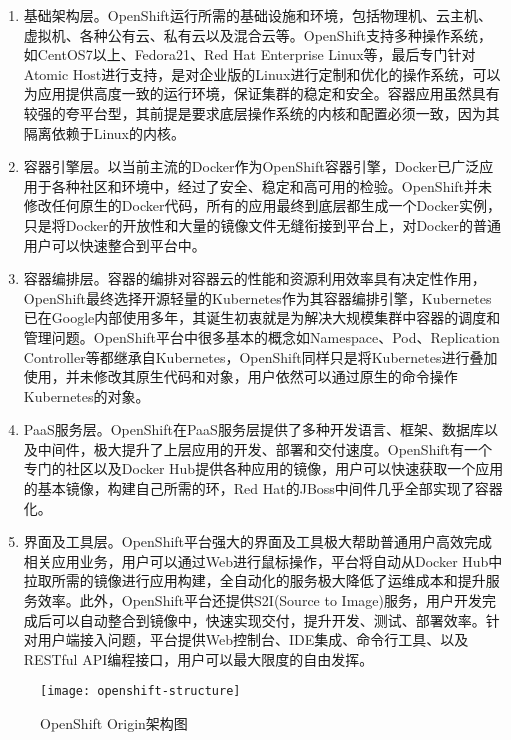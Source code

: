 \begin{enumerate}[1.]
	\item 基础架构层。OpenShift运行所需的基础设施和环境，包括物理机、云主机、虚拟机、各种公有云、私有云以及混合云等。OpenShift支持多种操作系统，如CentOS7以上、Fedora21、Red Hat Enterprise Linux等，最后专门针对Atomic Host进行支持，是对企业版的Linux进行定制和优化的操作系统，可以为应用提供高度一致的运行环境，保证集群的稳定和安全。容器应用虽然具有较强的夸平台型，其前提是要求底层操作系统的内核和配置必须一致，因为其隔离依赖于Linux的内核。
	\item 容器引擎层。以当前主流的Docker作为OpenShift容器引擎，Docker已广泛应用于各种社区和环境中，经过了安全、稳定和高可用的检验。OpenShift并未修改任何原生的Docker代码，所有的应用最终到底层都生成一个Docker实例，只是将Docker的开放性和大量的镜像文件无缝衔接到平台上，对Docker的普通用户可以快速整合到平台中。
	\item 容器编排层。容器的编排对容器云的性能和资源利用效率具有决定性作用，OpenShift最终选择开源轻量的Kubernetes作为其容器编排引擎，Kubernetes已在Google内部使用多年，其诞生初衷就是为解决大规模集群中容器的调度和管理问题。OpenShift平台中很多基本的概念如Namespace、Pod、Replication Controller等都继承自Kubernetes，OpenShift同样只是将Kubernetes进行叠加使用，并未修改其原生代码和对象，用户依然可以通过原生的命令操作Kubernetes的对象。
	\item PaaS服务层。OpenShift在PaaS服务层提供了多种开发语言、框架、数据库以及中间件，极大提升了上层应用的开发、部署和交付速度。OpenShift有一个专门的社区以及Docker Hub提供各种应用的镜像，用户可以快速获取一个应用的基本镜像，构建自己所需的环，Red Hat的JBoss中间件几乎全部实现了容器化。
	\item 界面及工具层。OpenShift平台强大的界面及工具极大帮助普通用户高效完成相关应用业务，用户可以通过Web进行鼠标操作，平台将自动从Docker Hub中拉取所需的镜像进行应用构建，全自动化的服务极大降低了运维成本和提升服务效率。此外，OpenShift平台还提供S2I(Source to Image)服务，用户开发完成后可以自动整合到镜像中，快速实现交付，提升开发、测试、部署效率。针对用户端接入问题，平台提供Web控制台、IDE集成、命令行工具、以及RESTful API编程接口，用户可以最大限度的自由发挥。
\end{enumerate}
\begin{figure}[H] %
	\centering
	\texttt{[image: openshift-structure]}
	\caption{OpenShift Origin架构图}
	\label{fig:xfig1}
\end{figure}

